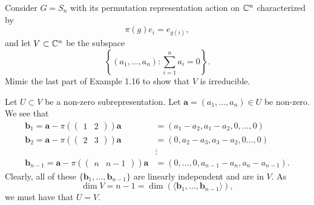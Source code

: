 \begin{questions}
  \question Consider $G = S_n$ with its permutation representation action on $\mathbb{C}^n$ characterized by
  \[ \pi(g)e_i = e_{g(i)}, \]
  and let $V \subset \mathbb{C}^n$ be the subspace
  \[ \left\{(a_1, \ldots, a_n): \sum_{i = 1}^n a_i = 0\right\}. \]
  Mimic the last part of Example 1.16 to show that $V$ is irreducible.
  \begin{solution}
    Let $U \subset V$ be a non-zero subrepresentation. Let $\bm a = (a_1, \ldots, a_n) \in U$ be non-zero. We see that
    \begin{align*}
      \bm b_1 = \bm a -
      \pi\left(
      \begin{pmatrix}
          1 & 2
        \end{pmatrix}
      \right) \bm a
       & = (a_1 - a_2, a_1 - a_2, 0, \ldots, 0)          \\
      \bm b_2 = \bm a -
      \pi\left(
      \begin{pmatrix}
          2 & 3
        \end{pmatrix}
      \right) \bm a
       & = (0, a_2 - a_3, a_3 - a_2, 0 \ldots, 0)        \\
       & \vdots                                          \\
      \bm b_{n-1} = \bm a - \pi\left(
      \begin{pmatrix}
          n & n - 1
        \end{pmatrix}
      \right) \bm a
       & = (0, \ldots, 0, a_{n-1} - a_n, a_n - a_{n-1}).
    \end{align*}
    Clearly, all of these $\{\bm b_1, \ldots, \bm b_{n-1}\}$ are linearly independent and are in $V$. As
    \[ \dim V = n -1 = \dim\left(\langle\bm b_1, \ldots, \bm b_{n-1}\rangle\right), \]
    we must have that $U = V$.
  \end{solution}


\end{questions}
